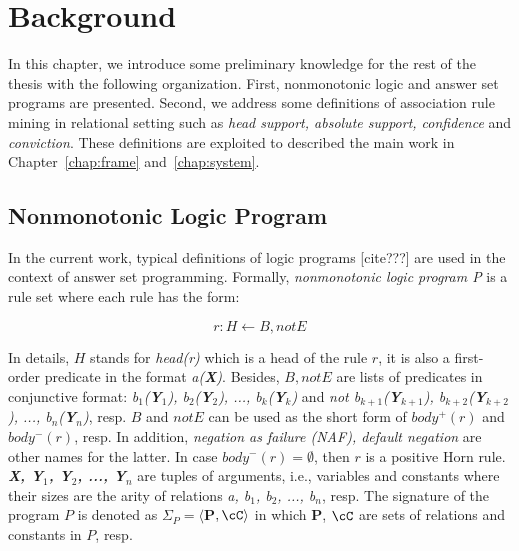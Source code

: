 \chapter{Background}
\label{chap:back}

In this chapter, we introduce some preliminary knowledge for the rest of the thesis with the following organization. First, nonmonotonic logic and answer set programs are presented. Second, we address some definitions of association rule mining in relational setting such as \textit{head support, absolute support, confidence} and \textit{conviction}. These definitions are exploited to described the main work in Chapter~\ref{chap:frame} and~\ref{chap:system}.

\section{Nonmonotonic Logic Program}

In the current work, typical definitions of logic programs [cite???] are used in the context of answer set programming. Formally, \textit{nonmonotonic logic program P} is a rule set where each rule has the form:

\begin{equation}
r: H \leftarrow B, not E
\end{equation}
\label{rule3}

In details, $H$ stands for \textit{head(r)} which is a head of the rule $r$, it is also a first-order predicate in the format \textit{a(\textbf{X})}. Besides, $B, not E$ are lists of predicates in conjunctive format: \textit{b$_1$(\textbf{Y}$_1$), b$_2$(\textbf{Y}$_2$), ..., b$_k$(\textbf{Y}$_k$)} and \textit{not b$_{k+1}$(\textbf{Y}$_{k+1}$), b$_{k+2}$(\textbf{Y}$_{k+2}$), ..., b$_n$(\textbf{Y}$_n$)}, resp. $B$ and $not E$ can be used as the short form of $body^+(r)$ and $body^-(r)$, resp. In addition, \textit{negation as failure (NAF), default negation} are other names for the latter. In case $body^-(r) = \emptyset$, then $r$ is a positive Horn rule. \textit{\textbf{X, Y$_{1}$, Y$_{2}$, ..., Y$_{n}$}} are tuples of arguments, i.e., variables and constants where their sizes are the arity of relations \textit{a, b$_1$, b$_2$, ..., b$_n$}, resp. The signature of the program $P$ is denoted as $\Sigma_{P} = \langle$\textbf{P}$, \cC\rangle$ in which \textbf{P}, $\cC$ are sets of relations and constants in $P$, resp.

